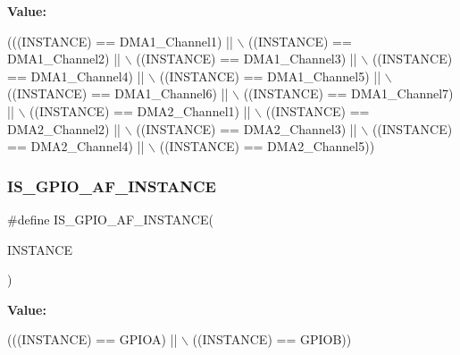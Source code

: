 {\bfseries Value\+:}
\begin{DoxyCode}
(((INSTANCE) == DMA1\_Channel1) || \(\backslash\)
                                       ((INSTANCE) == DMA1\_Channel2) || \(\backslash\)
                                       ((INSTANCE) == DMA1\_Channel3) || \(\backslash\)
                                       ((INSTANCE) == DMA1\_Channel4) || \(\backslash\)
                                       ((INSTANCE) == DMA1\_Channel5) || \(\backslash\)
                                       ((INSTANCE) == DMA1\_Channel6) || \(\backslash\)
                                       ((INSTANCE) == DMA1\_Channel7) || \(\backslash\)
                                       ((INSTANCE) == DMA2\_Channel1) || \(\backslash\)
                                       ((INSTANCE) == DMA2\_Channel2) || \(\backslash\)
                                       ((INSTANCE) == DMA2\_Channel3) || \(\backslash\)
                                       ((INSTANCE) == DMA2\_Channel4) || \(\backslash\)
                                       ((INSTANCE) == DMA2\_Channel5))
\end{DoxyCode}
\mbox{\label{group___exported__macro_ga9d2e0c4bb80b983730a3a5d98d56f535}} 
\subsubsection{\texorpdfstring{I\+S\+\_\+\+G\+P\+I\+O\+\_\+\+A\+F\+\_\+\+I\+N\+S\+T\+A\+N\+CE}{IS\_GPIO\_AF\_INSTANCE}\hspace{0.1cm}{\footnotesize\ttfamily [1/16]}}
{\footnotesize\ttfamily \#define I\+S\+\_\+\+G\+P\+I\+O\+\_\+\+A\+F\+\_\+\+I\+N\+S\+T\+A\+N\+CE(\begin{DoxyParamCaption}\item[{}]{I\+N\+S\+T\+A\+N\+CE }\end{DoxyParamCaption})}

{\bfseries Value\+:}
\begin{DoxyCode}
(((INSTANCE) == GPIOA) || \(\backslash\)
                                         ((INSTANCE) == GPIOB))
\end{DoxyCode}
\mbox{\label{group___exported__macro_ga9d2e0c4bb80b983730a3a5d98d56f535}} 
